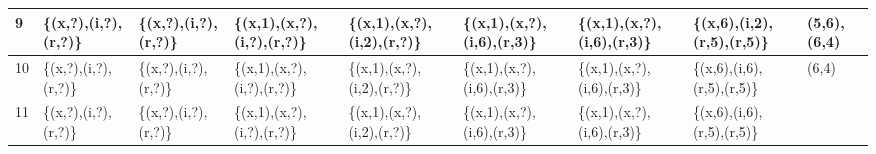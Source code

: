 \documentclass[]{article}
\begin{document}
\begin{sidewaystable}
\begin{tabularx}{\textwidth}{|l|X|X|X|X|X|X|X|X|}
			\hline
			9 & \{(x,?),(i,?),\newline(r,?)\} & \{(x,?),(i,?),\newline(r,?)\} & \{(x,1),(x,?),\newline\newline(i,?),(r,?)\} & \{(x,1),(x,?),\newline(i,2),\newline(r,?)\} & \{(x,1),(x,?),\newline\newline(i,6),(r,3)\} & \{(x,1),(x,?)\newline,\newline(i,6),(r,3)\} & \{(x,6),\newline(i,2),(r,5),\newline(r,5)\} & (5,6),(6,4)\\ 
			\hline
			10 & \{(x,?),(i,?),\newline(r,?)\} & \{(x,?),(i,?),\newline(r,?)\} & \{(x,1),(x,?),\newline\newline(i,?),(r,?)\} & \{(x,1),(x,?)\newline,\newline(i,2),\newline(r,?)\} & \{(x,1),(x,?),\newline\newline(i,6),(r,3)\} & \{(x,1),(x,?)\newline,\newline(i,6),(r,3)\} & \{(x,6),\newline(i,6),(r,5),\newline(r,5)\} & (6,4)\\ 
			\hline
			11 & \{(x,?),(i,?),\newline(r,?)\} & \{(x,?),(i,?),\newline(r,?)\} & \{(x,1),(x,?),\newline\newline(i,?),(r,?)\} & \{(x,1),(x,?)\newline,\newline(i,2),\newline(r,?)\} & \{(x,1),(x,?),\newline\newline(i,6),(r,3)\} & \{(x,1),(x,?)\newline,\newline(i,6),(r,3)\} & \{(x,6),\newline(i,6),(r,5),\newline(r,5)\} & \\ 
			\hline
		\end{tabularx}
	\end{sidewaystable}
\end{document}
